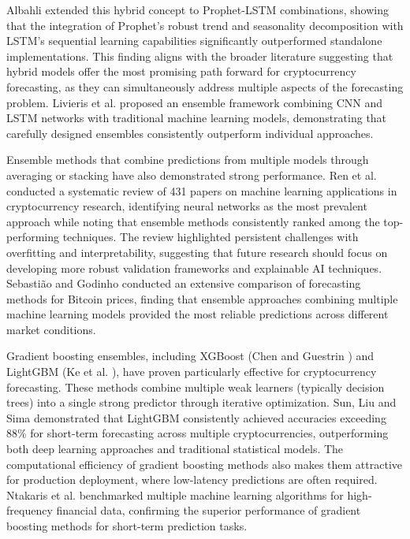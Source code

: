 \documentclass[conference]{IEEEtran}
\begin{document}
Albahli \cite{albahli2025} extended this hybrid concept to Prophet-LSTM combinations, showing that the integration of Prophet's robust trend and seasonality decomposition with LSTM's sequential learning capabilities significantly outperformed standalone implementations. This finding aligns with the broader literature suggesting that hybrid models offer the most promising path forward for cryptocurrency forecasting, as they can simultaneously address multiple aspects of the forecasting problem. Livieris et al. \cite{livieris2020} proposed an ensemble framework combining CNN and LSTM networks with traditional machine learning models, demonstrating that carefully designed ensembles consistently outperform individual approaches.

Ensemble methods that combine predictions from multiple models through averaging or stacking have also demonstrated strong performance. Ren et al. \cite{ren2022} conducted a systematic review of 431 papers on machine learning applications in cryptocurrency research, identifying neural networks as the most prevalent approach while noting that ensemble methods consistently ranked among the top-performing techniques. The review highlighted persistent challenges with overfitting and interpretability, suggesting that future research should focus on developing more robust validation frameworks and explainable AI techniques. Sebasti\~{a}o and Godinho \cite{sebastiao2021} conducted an extensive comparison of forecasting methods for Bitcoin prices, finding that ensemble approaches combining multiple machine learning models provided the most reliable predictions across different market conditions.

Gradient boosting ensembles, including XGBoost (Chen and Guestrin \cite{chen2016}) and LightGBM (Ke et al. \cite{ke2017}), have proven particularly effective for cryptocurrency forecasting. These methods combine multiple weak learners (typically decision trees) into a single strong predictor through iterative optimization. Sun, Liu and Sima \cite{sun2020} demonstrated that LightGBM consistently achieved accuracies exceeding 88\% for short-term forecasting across multiple cryptocurrencies, outperforming both deep learning approaches and traditional statistical models. The computational efficiency of gradient boosting methods also makes them attractive for production deployment, where low-latency predictions are often required. Ntakaris et al. \cite{ntakaris2019} benchmarked multiple machine learning algorithms for high-frequency financial data, confirming the superior performance of gradient boosting methods for short-term prediction tasks.
\end{document}
